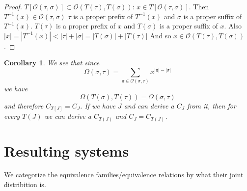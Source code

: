 \documentclass[a4paper, 11pt, english]{article}
\newtheorem{corollary}[theorem]{Corollary}
\theoremstyle{definition}
\newcommand{\Ocal}{\mathcal{O}}
\begin{document}
\begin{appendices}
\begin{proof}
    $T[\Ocal(\tau, \sigma)] \subset \Ocal(T(\tau), T(\sigma))$: 
    $x \in T[\Ocal(\tau, \sigma)]$. Then $T^{-1}(x) \in \Ocal(\tau, \sigma)$
    $\tau$ is a proper prefix of $T^{-1}(x)$ and $\sigma$ is a proper suffix of $T^{-1}(x)$. 
    $T(\tau)$ is a proper prefix of $x$ and $T(\sigma)$ is a proper suffix of
    $x$. Also $|x| = |T^{-1}(x)| < |\tau| + |\sigma| = |T(\sigma)| + |T(\tau)|$
    And so $x \in \Ocal(T(\tau), T(\sigma))$.
\end{proof}

\begin{corollary}
    We see that since 
    \[
        \Omega(\sigma, \tau) = \sum_{\pi \in \Ocal(\sigma, \tau)} x^{|\pi|-|\sigma|}
    \]
    we have
    \[
        \Omega(T(\sigma), T(\tau)) = \Omega(\sigma, \tau)
    \]
    and therefore $C_{T[J]} = C_J$.
    If we have $J$ and can derive a $C_J$ from it, then for every $T(J)$ we can
    derive a $C_{T(J)}$ and $C_J = C_{T(J)}$.
\end{corollary}

\section{Resulting systems}
We categorize the equivalence families/equivalence relations by what their joint
distribition is.

\begin{multicols}{2}

\end{multicols}
\end{appendices}
\end{document}
